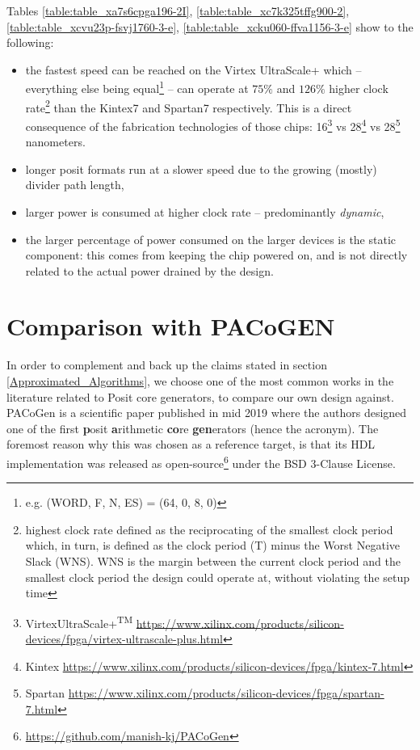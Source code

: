 Tables \ref{table:table_xa7s6cpga196-2I}, \ref{table:table_xc7k325tffg900-2}, \ref{table:table_xcvu23p-fsvj1760-3-e}, \ref{table:table_xcku060-ffva1156-3-e} show  to the following:
\begin{itemize}
    \item the fastest speed can be reached on the Virtex UltraScale+ which -- everything else being equal\footnote{e.g. (WORD, F, N, ES) = (64, 0, 8, 0)} -- can operate at $75 \%$ and $126 \%$ higher clock rate\footnote{highest clock rate defined as the reciprocating of the smallest clock period which, in turn, is defined as the clock period (T) minus the Worst Negative Slack (WNS). WNS is the margin between the current clock period and the smallest clock period the design could operate at, without violating the setup time} than the Kintex7 and Spartan7 respectively. This is a direct consequence of the fabrication technologies of those chips: 16\footnote{Virtex\textregistered UltraScale+\textsuperscript{TM} \url{https://www.xilinx.com/products/silicon-devices/fpga/virtex-ultrascale-plus.html}} vs 28\footnote{Kintex \url{https://www.xilinx.com/products/silicon-devices/fpga/kintex-7.html}} vs 28\footnote{Spartan \url{https://www.xilinx.com/products/silicon-devices/fpga/spartan-7.html}} nanometers.
    \item longer posit formats run at a slower speed due to the growing (mostly) divider path length,
    \item larger power is consumed at higher clock rate -- predominantly \textit{dynamic},
    \item the larger percentage of power consumed on the larger devices is the static component: this comes from keeping the chip powered on, and is not directly related to the actual power drained by the design.
\end{itemize}



\section{Comparison with PACoGEN}

In order to complement and back up the claims stated in section \ref{Approximated_Algorithms}, we choose one of the most common works in the literature related to Posit core generators, to compare our own design against.
PACoGen \cite{PACoGen} is a scientific paper published in mid 2019 where the authors designed one of the first \textbf{p}osit \textbf{a}rithmetic \textbf{co}re \textbf{gen}erators (hence the acronym). The foremost reason why this was chosen as a reference target, is that its HDL implementation was released as open-source\footnote{\url{https://github.com/manish-kj/PACoGen}} under the BSD 3-Clause License.


